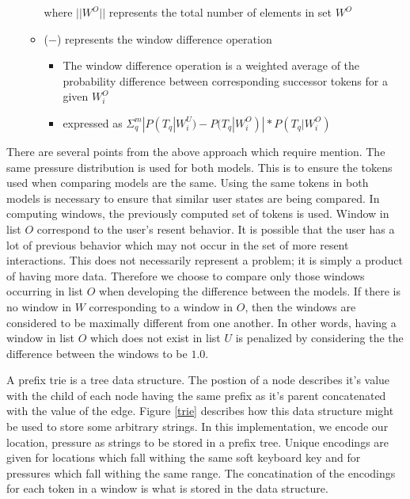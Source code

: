 \begin{enumerate}
\begin{itemize}
    where $||W^O||$ represents the total number of elements in set $W^O$
  \item ($-$) represents the window difference operation
    \begin{itemize}
    \item The window difference operation is
      a weighted average of the probability difference
      between corresponding successor tokens for a given $W_i^O$
    \item expressed as $\Sigma_q^m |P(T_q|W_i^U)-P(T_q|W_i^O)| * P(T_q|W_i^O)$
    \end{itemize}
  \end{itemize}
\end{enumerate}
%
There are several points from the above approach which require mention.
%
The same pressure distribution is used for both models.
This is to ensure the tokens used when comparing models are the same.
Using the same tokens in both models is necessary
to ensure that similar user states are being compared.
%
In computing windows, 
the previously computed set of tokens is used.
%
Window in list $O$ correspond to the user's resent behavior.
It is possible that the user has a lot of previous behavior
which may not occur in the set of more resent interactions.
%
This does not necessarily represent a problem;
it is simply a product of having more data.
%
Therefore we choose to compare only those windows occurring in
list $O$ when developing the difference between the models.
%
If there is no window in $W$ corresponding to a window in $O$,
then the windows are considered to be maximally different from one another.
In other words,
having a window in list $O$ which does not exist in list $U$ is
penalized by considering the the difference between the windows to be $1.0$.


A prefix trie is a
tree data structure.
The postion of a node describes it's value
with the child of each node
having the same prefix as it's parent
concatenated with the value of the edge.
%
Figure \ref{trie}
describes how this data structure might
be used to store some arbitrary strings.
%
In this implementation,
we encode our location, pressure
as strings to be stored in a prefix tree.
Unique encodings are given for
locations which fall withing the same soft keyboard key and
for pressures which fall withing the same range.
%
The concatination of the encodings for each
token in a window is what is stored in the data structure.

